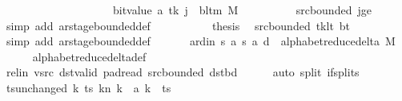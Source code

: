 \begin{isabellebody}
\ \ \ \ \ \ \ \ \ \ \ \ \ \ \ \ \ \ \ {\isacharplus}{\kern0pt}\ bit{\isacharunderscore}{\kern0pt}value\ {\isacharparenleft}{\kern0pt}{\isacharquery}{\kern0pt}a\ tk{\isacharparenright}{\kern0pt}{\isacharparenright}{\kern0pt}{\isacharparenright}{\kern0pt}{\isacharparenright}{\kern0pt}\ j\ {\isacharequal}{\kern0pt}\ bl{\isacharunderscore}{\kern0pt}tm\ M{\isachardoublequoteclose}\isanewline
\ \ \ \ \ \ \ \ \isamarkupfalse%
\ src{\isacharunderscore}{\kern0pt}bounded\ jge\ \isamarkupfalse%
\ {\isacharparenleft}{\kern0pt}simp\ add{\isacharcolon}{\kern0pt}\ ar{\isacharunderscore}{\kern0pt}stage{\isacharunderscore}{\kern0pt}bounded{\isacharunderscore}{\kern0pt}def{\isacharparenright}{\kern0pt}\isanewline
\ \ \ \ \isamarkupfalse%
\isanewline
\ \ \ \ \isamarkupfalse%
\ {\isacharquery}{\kern0pt}thesis\ \isamarkupfalse%
\ src{\isacharunderscore}{\kern0pt}bounded\ tk{\isacharunderscore}{\kern0pt}lt\ bt\ \isamarkupfalse%
\ {\isacharparenleft}{\kern0pt}simp\ add{\isacharcolon}{\kern0pt}\ ar{\isacharunderscore}{\kern0pt}stage{\isacharunderscore}{\kern0pt}bounded{\isacharunderscore}{\kern0pt}def{\isacharparenright}{\kern0pt}\isanewline
\ \ \isamarkupfalse%
\isanewline
\ \ \isamarkupfalse%
\ ard{\isacharunderscore}{\kern0pt}in{\isacharcolon}{\kern0pt}\ {\isachardoublequoteopen}{\isacharparenleft}{\kern0pt}{\isacharquery}{\kern0pt}s{\isacharcomma}{\kern0pt}\ {\isacharquery}{\kern0pt}a{\isacharcomma}{\kern0pt}\ {\isacharquery}{\kern0pt}s{\isacharprime}{\kern0pt}{\isacharcomma}{\kern0pt}\ {\isacharquery}{\kern0pt}a{\isacharcomma}{\kern0pt}\ {\isacharquery}{\kern0pt}d{\isacharparenright}{\kern0pt}\ {\isasymin}\ alphabet{\isacharunderscore}{\kern0pt}reduce{\isacharunderscore}{\kern0pt}delta\ M{\isachardoublequoteclose}\isanewline
\ \ \ \ \isamarkupfalse%
\ alphabet{\isacharunderscore}{\kern0pt}reduce{\isacharunderscore}{\kern0pt}delta{\isacharunderscore}{\kern0pt}def\isanewline
\ \ \ \ \isamarkupfalse%
\ rel{\isacharunderscore}{\kern0pt}in\ vsrc\ dst{\isacharunderscore}{\kern0pt}valid\ pad{\isacharunderscore}{\kern0pt}read\ src{\isacharunderscore}{\kern0pt}bounded\ dst{\isacharunderscore}{\kern0pt}bd\isanewline
\ \ \ \ \isamarkupfalse%
\ {\isacharparenleft}{\kern0pt}auto\ split{\isacharcolon}{\kern0pt}\ if{\isacharunderscore}{\kern0pt}splits{\isacharparenright}{\kern0pt}\isanewline
\ \ \isamarkupfalse%
\ ts{\isacharunderscore}{\kern0pt}unchanged{\isacharcolon}{\kern0pt}\ {\isachardoublequoteopen}{\isacharparenleft}{\kern0pt}{\isasymlambda}k{\isachardot}{\kern0pt}\ {\isacharparenleft}{\kern0pt}ts\ k{\isacharparenright}{\kern0pt}{\isacharparenleft}{\kern0pt}n\ k\ {\isacharcolon}{\kern0pt}{\isacharequal}{\kern0pt}\ {\isacharquery}{\kern0pt}a\ k{\isacharparenright}{\kern0pt}{\isacharparenright}{\kern0pt}\ {\isacharequal}{\kern0pt}\ ts{\isachardoublequoteclose}\ \isamarkupfalse%

\end{isabellebody}
